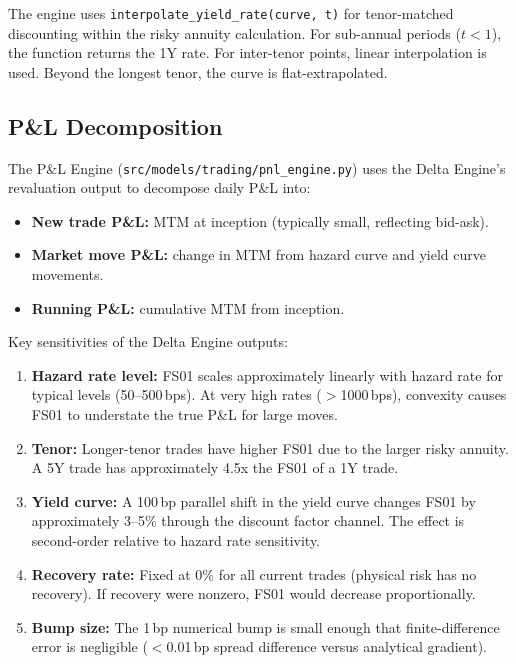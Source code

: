 \documentclass[11pt,a4paper]{article}
\begin{document}
The engine uses \texttt{interpolate\_yield\_rate(curve, t)} for tenor-matched discounting within the risky annuity calculation. For sub-annual periods ($t < 1$), the function returns the 1Y rate. For inter-tenor points, linear interpolation is used. Beyond the longest tenor, the curve is flat-extrapolated.

\subsection{P\&L Decomposition}

The P\&L Engine (\texttt{src/models/trading/pnl\_engine.py}) uses the Delta Engine's revaluation output to decompose daily P\&L into:
\begin{itemize}
    \item \textbf{New trade P\&L:} MTM at inception (typically small, reflecting bid-ask).
    \item \textbf{Market move P\&L:} change in MTM from hazard curve and yield curve movements.
    \item \textbf{Running P\&L:} cumulative MTM from inception.
\end{itemize}

\clearpage

\mkmsensitivity

Key sensitivities of the Delta Engine outputs:

\begin{enumerate}
    \item \textbf{Hazard rate level:} FS01 scales approximately linearly with hazard rate for typical levels (50--500\,bps). At very high rates ($>$1000\,bps), convexity causes FS01 to understate the true P\&L for large moves.
    \item \textbf{Tenor:} Longer-tenor trades have higher FS01 due to the larger risky annuity. A 5Y trade has approximately 4.5x the FS01 of a 1Y trade.
    \item \textbf{Yield curve:} A 100\,bp parallel shift in the yield curve changes FS01 by approximately 3--5\% through the discount factor channel. The effect is second-order relative to hazard rate sensitivity.
    \item \textbf{Recovery rate:} Fixed at 0\% for all current trades (physical risk has no recovery). If recovery were nonzero, FS01 would decrease proportionally.
    \item \textbf{Bump size:} The 1\,bp numerical bump is small enough that finite-difference error is negligible ($<$0.01\,bp spread difference versus analytical gradient).
\end{enumerate}
\end{document}
